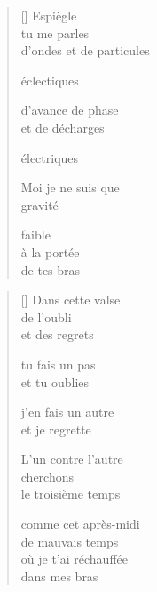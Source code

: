 \documentclass[11pt,a4paper]{book}
\begin{document}
\newpage


\settowidth{\versewidth}{d'onde et de particules}

\bigskip

\begin{verse}[\versewidth]
  Espiègle \\
  tu me parles \\
  d'ondes et de particules

  éclectiques

  d'avance de phase \\
  et de décharges

  électriques

  Moi je ne suis que \\
  gravité

  faible \\
  à la portée \\
  de tes bras
\end{verse}

\newpage


\settowidth{\versewidth}{où je t'ai réchauffée}

\bigskip

\begin{verse}[\versewidth]
  Dans cette valse \\
  de l'oubli \\
  et des regrets

  tu fais un pas \\
  et tu oublies

  j'en fais un autre \\
  et je regrette

  L'un contre l'autre \\
  cherchons \\
  le troisième temps

  comme cet après-midi \\
  de mauvais temps \\
  où je t'ai réchauffée \\
  dans mes bras
\end{verse}

\newpage


\settowidth{\versewidth}{--- Faisons du pain perdu!}

\bigskip
\end{document}
